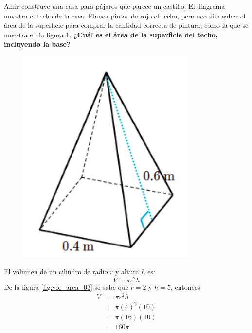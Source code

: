 \question[10] Amir construye una casa para pájaros que parece un castillo. El diagrama muestra el techo de la casa.
Planea pintar de rojo el techo, pero necesita saber el área de la superficie para comprar la cantidad correcta de pintura,
como la que se muestra en la figura \ref{fig:prob_verb_superficie_06}.
\textbf{¿Cuál es el área de la superficie del techo, incluyendo la base?}

\begin{minipage}{0.3\linewidth}
    \begin{figure}[H]
        \begin{center}
            \includegraphics[width=0.8\textwidth]{../images/prob_verb_superficie_06}
        \end{center}
        \caption{}
        \label{fig:prob_verb_superficie_06}
    \end{figure}
\end{minipage}
\begin{minipage}{0.7\linewidth}
    \begin{solutionbox}{6cm}
        El volumen de un cilindro de radio $r$ y altura $h$ es:
        \begin{equation*}
            V = \pi r^2 h
        \end{equation*}
        De la figura \ref{fig:vol_area_03} se sabe que $r=2$ y $h=5$, entonces
        \begin{equation*}
            \begin{split}
                V & = \pi r^2 h\\
                & = \pi (4)^2 (10)\\
                & = \pi (16) (10)\\
                & = 160\pi
            \end{split}
        \end{equation*}
    \end{solutionbox}
\end{minipage}